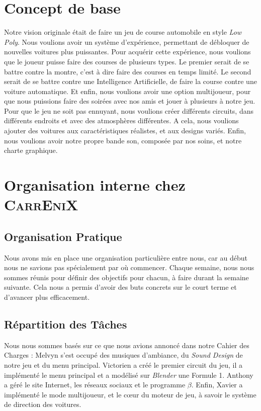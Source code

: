 \documentclass[a4paper,12pt]{article}
\newcommand{\AI}{Intelligence Artificielle}
\newcommand{\CEX}{\textsc{CarrEniX}}
\begin{document}
    \section{Concept de base}
        Notre vision originale était de faire un jeu de course automobile en style \textit{Low Poly}.
        Nous voulions avoir un système d'expérience, permettant de débloquer de nouvelles voitures plus puissantes.
        Pour acquérir cette expérience, nous voulions que le joueur puisse faire des courses de plusieurs types.
        Le premier serait de se battre contre la montre, c'est à dire faire des courses en temps limité.
        Le second serait de se battre contre une \AI, de faire la course contre une voiture automatique.
        Et enfin, nous voulions avoir une option multijoueur, pour que nous puissions faire des soirées avec nos amis
        et jouer à plusieurs à notre jeu. Pour que le jeu ne soit pas ennuyant, nous voulions créer différents
        circuits, dans différents endroits et avec des atmosphères différentes. A cela, nous voulions ajouter des voitures aux caractéristiques réalistes, et aux designs variés. Enfin, nous voulions avoir notre propre
        bande son, composée par nos soins, et notre charte graphique.
    
    
    \section{Organisation interne chez \CEX}
    \subsection{Organisation Pratique}
        Nous avons mis en place une organisation particulière entre nous,
        car au début nous ne savions pas spécialement par où commencer.
        Chaque semaine, nous nous sommes réunis pour définir des 
        objectifs pour chacun, à faire durant la semaine suivante. Cela nous 
        a permis d’avoir des buts concrets sur le court terme et d'avancer plus 
        efficacement.

    \subsection{Répartition des Tâches}
        Nous nous sommes basés sur ce que nous avions annoncé dans notre Cahier des Charges :
        Melvyn s'est occupé des musiques d'ambiance, du \textit{Sound Design} de 
        notre jeu et du menu principal. Victorien a créé le premier circuit du jeu,
        il a implémenté le menu principal et a modélisé sur \textsl{Blender} une Formule 1.
        Anthony a géré le site Internet, les réseaux sociaux et le programme \(\beta\).
        Enfin, Xavier a implémenté le mode multijoueur, et le cœur du moteur de jeu,
        à savoir le système de direction des voitures.
        
\end{document}
